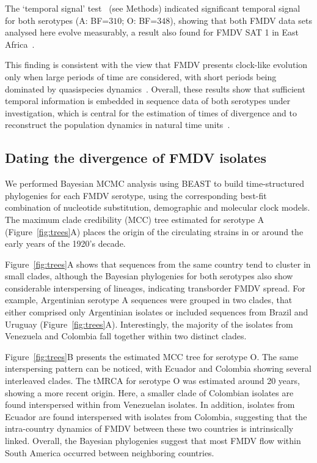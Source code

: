 \documentclass[10pt]{article}
\begin{document}
The  `temporal signal' test~\cite{Faria2012} (see Methods) indicated significant temporal signal for both serotypes (A: BF=$310$; O: BF=$348$), showing that both FMDV data sets analysed here evolve measurably, a result also found for FMDV SAT 1 in East Africa~\cite{sangula}.

This finding is consistent with the view that FMDV presents clock-like evolution only when large periods of time are considered, with short periods being dominated by quasispecies dynamics~\cite{Muellner2011}.
Overall, these results show that sufficient temporal information is embedded in sequence data of both serotypes under investigation, which is central for the estimation of times of divergence and to reconstruct the population dynamics in natural time units~\cite{MEP}.

\subsection*{Dating the divergence of FMDV isolates}

We performed Bayesian MCMC analysis using BEAST to build time-structured phylogenies for each FMDV serotype, using the corresponding best-fit combination of nucleotide substitution, demographic and molecular clock models.
The maximum clade credibility (MCC) tree estimated for serotype A (Figure~\ref{fig:trees}A) places the origin of the circulating strains in or around the early years of the 1920's decade.

Figure~\ref{fig:trees}A shows that sequences from the same country tend to cluster in small clades, although the Bayesian phylogenies for both serotypes also show considerable interspersing of lineages, indicating transborder FMDV spread.
For example, Argentinian serotype A sequences were grouped in two clades, that either comprised only Argentinian isolates or included sequences from Brazil and Uruguay (Figure~\ref{fig:trees}A).
Interestingly, the majority of the isolates from Venezuela and Colombia fall together within two distinct clades. 

Figure~\ref{fig:trees}B presents the estimated MCC tree for serotype O.
The same interspersing pattern can be noticed, with Ecuador and Colombia showing several interleaved clades.
The tMRCA for serotype O was estimated around 20 years, showing a more recent origin.
Here, a smaller clade of Colombian isolates are found interspersed within from Venezuelan isolates.
In addition, isolates from Ecuador are found interspersed with isolates from Colombia, suggesting that the intra-country dynamics of FMDV between these two countries is intrinsically linked.
Overall, the Bayesian phylogenies suggest that most FMDV flow within South America occurred between neighboring countries. 
\end{document}
